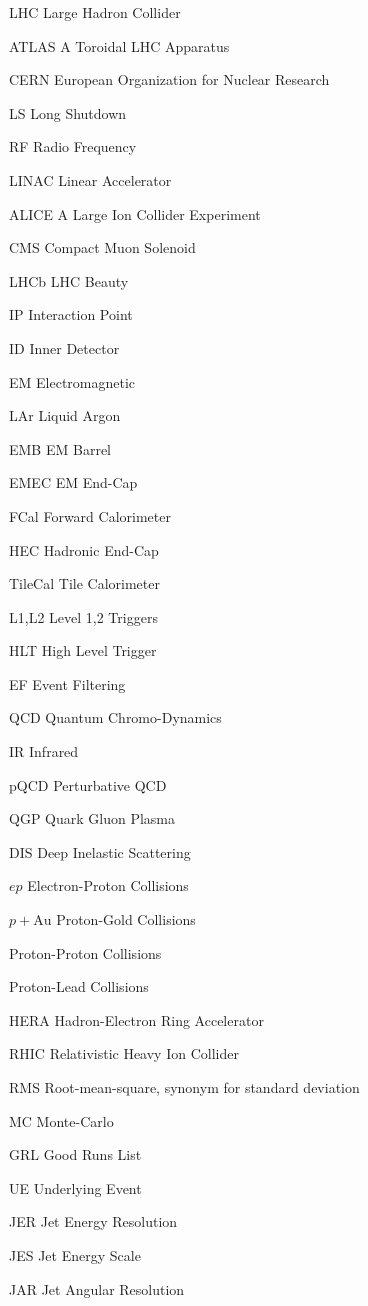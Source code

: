 \begin{symbollist*}
\item [LHC] Large Hadron Collider
\item [ATLAS] A Toroidal LHC Apparatus
\item [CERN] European Organization for Nuclear Research
\item [LS] Long Shutdown
\item [RF] Radio Frequency
\item [LINAC] Linear Accelerator
\item [ALICE] A Large Ion Collider Experiment
\item [CMS] Compact Muon Solenoid
\item [LHCb] LHC Beauty
\item [IP] Interaction Point
\item [ID] Inner Detector
\item [EM] Electromagnetic
\item [LAr] Liquid Argon
\item [EMB] EM Barrel
\item [EMEC] EM End-Cap
\item [FCal] Forward Calorimeter
\item [HEC] Hadronic End-Cap
\item [TileCal] Tile Calorimeter
\item [L1,L2] Level 1,2 Triggers
\item [HLT] High Level Trigger
\item [EF] Event Filtering
\item [QCD] Quantum Chromo-Dynamics
\item [IR] Infrared
\item [pQCD] Perturbative QCD
\item [QGP] Quark Gluon Plasma
\item [DIS] Deep Inelastic Scattering
\item [$ep$] Electron-Proton Collisions
\item [$p+\mathrm{Au}$] Proton-Gold Collisions
\item [\pp] Proton-Proton Collisions
\item [\pPb] Proton-Lead Collisions
\item [HERA] Hadron-Electron Ring Accelerator
\item [RHIC] Relativistic Heavy Ion Collider
\item [RMS] Root-mean-square, synonym for standard deviation
\item [MC] Monte-Carlo
\item [GRL] Good Runs List
\item [UE] Underlying Event
\item [JER] Jet Energy Resolution
\item [JES] Jet Energy Scale
\item [JAR] Jet Angular Resolution
\end{symbollist*}
